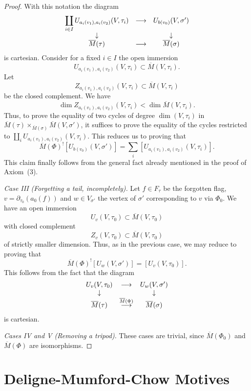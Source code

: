 \documentclass[11pt]{amsart}
\newtheorem{conjecture}[prop]{Conjecture}
\theoremstyle{definition}
\theoremstyle{remark}
\newenvironment{pf}{\begin{proof}}{\end{proof}}
\newcommand{\noprint}[1]{}
\renewcommand{\tilde}{\widetilde}
\newcommand{\upsh}{^{!}}
\newcommand{\GG}{{\mathfrak{G}}}
\newcommand{\del}{\partial}
\newcommand{\ol}{\overline}
\newcommand{\ldiag}[1]
       {\makebox[0cm]{\({\scriptstyle#1}\downarrow\phantom{\scriptstyle#1}\)}}
\newcommand{\rdiag}[1]
       {\makebox[0cm]{\(\phantom{\scriptstyle#1}\downarrow{\scriptstyle#1}\)}}
\newcommand{\comdia}[9]{
\begin{array}{ccc}
#1 & \stackrel{#2}{\longrightarrow} & #3 \\
\ldiag{#4} & #5 & \rdiag{#6} \\
#7 & \stackrel{#8}{\longrightarrow} & #9
\end{array}}
\renewcommand{\t}{_{\tau}}
\theoremstyle{plain}
\theoremstyle{definition}
\theoremstyle{remark}
\begin{document}
\begin{pf}
With this notation the diagram
\[
\comdia{\displaystyle\coprod_{i\in I}
U_{a_i(v_1),a_i(v_2)}(V,\tau_i)}{}{U_{b(v_0)}(V,\sigma')}{}{
}{}{\ol{M}(\tau)}{}{\ol{M}(\sigma)}
\]
is cartesian. Consider for a fixed \(i\in I\) the open immersion
\[
U_{a_i(v_1),a_i(v_2)}(V,\tau_i)\subset\ol{M}(V,\tau_i).
\]
Let
\[
Z_{a_i(v_1),a_i(v_2)}(V,\tau_i)\subset\ol{M}(V,\tau_i)
\]
be the closed complement. We have
\[
\dim Z_{a_i(v_1),a_i(v_2)}(V,\tau_i)<\dim \ol{M}(V,\tau_i).
\]
Thus, to prove the equality of two cycles of degree \(\dim(V,\tau_i)\) in
\(\ol{M}(\tau)\times_{\ol{M}(\sigma)}\ol{M}(V,\sigma')\), it suffices to prove
the equality of the cycles restricted to
\(\coprod_i U_{a_i(v_1),a_i(v_2)}(V,\tau_i)\). This reduces us to proving that
\[
\ol{M}(\Phi)\upsh[U_{b(v_0)}(V,\sigma')]=\sum_i[U_{a_i(v_1),
a_i(v_2)}(V,\tau_i)].
\]
This claim finally follows from the general fact already mentioned in the proof
of Axiom~(3).

{\em Case III (Forgetting a tail, incompletely). }
Let \(f\in F\t\) be the forgotten flag, \(v=\del_{\tau_0}(a_0(f))\) and \(w\in
V_{\sigma'}\) the vertex of \(\sigma'\)
corresponding to \(v\) via \(\Phi_0\). We have an open immersion
\[
U_v(V,\tau_0)\subset \ol{M}(V,\tau_0)
\]
with closed complement
\[
Z_v(V,\tau_0)\subset \ol{M}(V,\tau_0)
\]
of strictly smaller dimension. Thus, as in the previous case, we may reduce to
proving that
\[
\ol{M}(\Phi)\upsh[U_w(V,\sigma')]=[U_v(V,\tau_0)].
\]
This follows from the fact that the diagram
\[
\comdia{U_v(V,\tau_0)}{}{U_w(V,\sigma')}{}{}{
}{\ol{M}(\tau)}{\ol{M}(\Phi)}{\ol{M}(\sigma)}
\]
is cartesian.

{\em Cases IV and V (Removing a tripod). } These cases are trivial, since
\(\ol{M}(\Phi_0)\) and \(\ol{M}(\Phi)\) are
isomorphisms.
\end{pf}

\noprint{
\begin{conjecture} \label{gmc}
Let \(V\) be a Grassmannian variety. Then the collection
\[
J(V,\tau)=[\ol{M}(V,\tau)]^0
\]
is an orientation of \(\ol{M}\) over \(\tilde{\GG}_s(V)\).
\end{conjecture}
\begin{pf}
\end{pf}
}

\section{Deligne-Mumford-Chow Motives}
\end{document}
